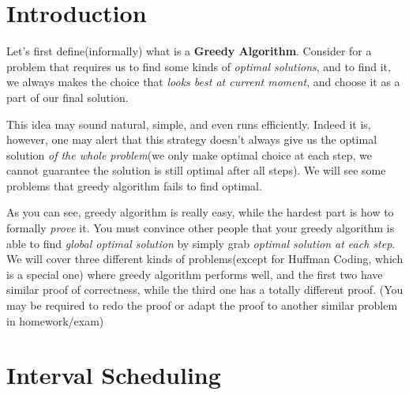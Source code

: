 \begin{spacing}{1.3}

    \section{Introduction}

    Let's first define(informally) what is a {\bf Greedy Algorithm}. Consider for a problem 
    that requires us to find some kinds of {\it optimal solutions}, and to find it, 
    we always makes the choice that {\it looks best at current moment}, and choose it as 
    a part of our final solution.

    This idea may sound natural, simple, and even runs efficiently. Indeed it is, however, 
    one may alert that this strategy doesn't always give us the optimal solution 
    {\it of the whole problem}(we only make optimal choice at each step, we cannot guarantee 
    the solution is still optimal after all steps). We will see some problems that greedy 
    algorithm fails to find optimal.

    As you can see, greedy algorithm is really easy, while the hardest part is how to formally
    {\it prove} it. You must convince other people that your greedy algorithm is able to 
    find {\it global optimal solution} by simply grab {\it optimal solution at each step}.
    We will cover three different kinds of problems(except for Huffman Coding, which is a special one) 
    where greedy algorithm performs well, and the first two have similar proof of correctness,
    while the third one has a totally different proof.
    (You may be required to redo the proof or adapt the proof to another similar 
    problem in homework/exam)


    \section{Interval Scheduling}


\end{spacing}
